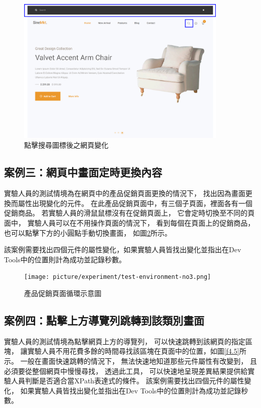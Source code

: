 \begin{figure}[H]
    \centering
    \setlength{\abovecaptionskip}{-5pt}
    \setlength{\belowcaptionskip}{0pt}
    \includegraphics[width=0.9\textwidth]{picture/experiment/test-environment-no2.png}
    \caption{點擊搜尋圖標後之網頁變化}
    \label{f4.3}
\end{figure}

\subsection{案例三：網頁中畫面定時更換內容}\label{s4.2.3}
\indent
實驗人員的測試情境為在網頁中的產品促銷頁面更換的情況下，
找出因為畫面更換而屬性出現變化的元件。
在此產品促銷頁面中，有三個子頁面，裡面各有一個促銷商品。
若實驗人員的滑鼠鼠標沒有在促銷頁面上，
它會定時切換至不同的頁面中，
實驗人員可以在不用操作頁面的情況下，
看到每個在頁面上的促銷商品，
也可以點擊下方的小圓點手動切換畫面，
如圖\ref{f4.4}所示。

該案例需要找出四個元件的屬性變化，如果實驗人員皆找出變化並指出在Dev Tools中的位置則計為成功並記錄秒數。

\begin{figure}[H]
    \centering
    \setlength{\abovecaptionskip}{-5pt}
    \setlength{\belowcaptionskip}{0pt}
    \texttt{[image: picture/experiment/test-environment-no3.png]}
    \caption{產品促銷頁面循環示意圖}
    \label{f4.4}
\end{figure}


\subsection{案例四：點擊上方導覽列跳轉到該類別畫面}\label{s4.2.4}
\indent
實驗人員的測試情境為點擊網頁上方的導覽列，
可以快速跳轉到該網頁的指定區塊，
讓實驗人員不用花費多餘的時間尋找該區塊在頁面中的位置，如圖\ref{f4.5}所示。
一般在畫面快速跳轉的情況下，
無法快速地知道那些元件屬性有改變到，
且必須要從整個網頁中慢慢尋找，
透過此工具，
可以快速地呈現差異結果提供給實驗人員判斷是否適合當XPath表達式的條件。
該案例需要找出四個元件的屬性變化，
如果實驗人員皆找出變化並指出在Dev Tools中的位置則計為成功並記錄秒數。

